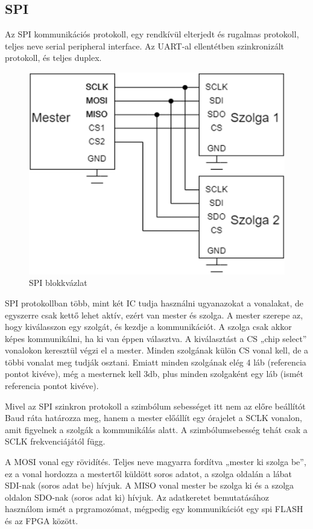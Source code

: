 \documentclass[a4paper,12pt,oneside]{book}
\begin{document}
\subsection{SPI}
Az SPI kommunikációs protokoll, egy rendkívül elterjedt és rugalmas protokoll, teljes neve serial peripheral interface. Az UART-al ellentétben szinkronizált protokoll, és teljes duplex.
\begin{figure}[H]
	\centering
	\includegraphics[trim=1mm 1mm 1mm 1mm,scale=0.5]{SPIblockk.PNG}
	\caption{SPI blokkvázlat}
	\label{SPI blokkvázlat}
\end{figure}
SPI protokollban több, mint két IC tudja használni ugyanazokat a vonalakat, de egyszerre csak kettő lehet aktív, ezért van mester és szolga. A mester szerepe az, hogy kiválasszon egy szolgát, és kezdje a kommunikációt. A szolga csak akkor képes kommunikálni, ha ki van éppen választva. A kiválasztást a CS „chip select” vonalokon keresztül végzi el a mester. Minden szolgának külön CS vonal kell, de a többi vonalat meg tudják osztani. Emiatt minden szolgának elég 4 láb (referencia pontot kivéve), még a mesternek kell 3db, plus minden szolgaként egy láb (ismét referencia pontot kivéve). 


Mivel az SPI szinkron protokoll a szimbólum sebességet itt nem az előre beállítót Baud ráta határozza meg, hanem a mester előállít egy órajelet a SCLK vonalon, amit figyelnek a szolgák a kommunikálás alatt. A szimbólumsebesség tehát csak a SCLK frekvenciájától függ. 


A MOSI vonal egy rövidítés. Teljes neve magyarra fordítva „mester ki szolga be”, ez a vonal hordozza a mestertől küldött soros adatot, a szolga oldalán a lábat SDI-nak (soros adat be) hívjuk. A MISO vonal mester be szolga ki és a szolga oldalon SDO-nak (soros adat ki) hívjuk. Az adatkeretet bemutatásához használom ismét a prgramozómat, mégpedig egy kommunikációt egy spi FLASH és az FPGA között.
\end{document}
